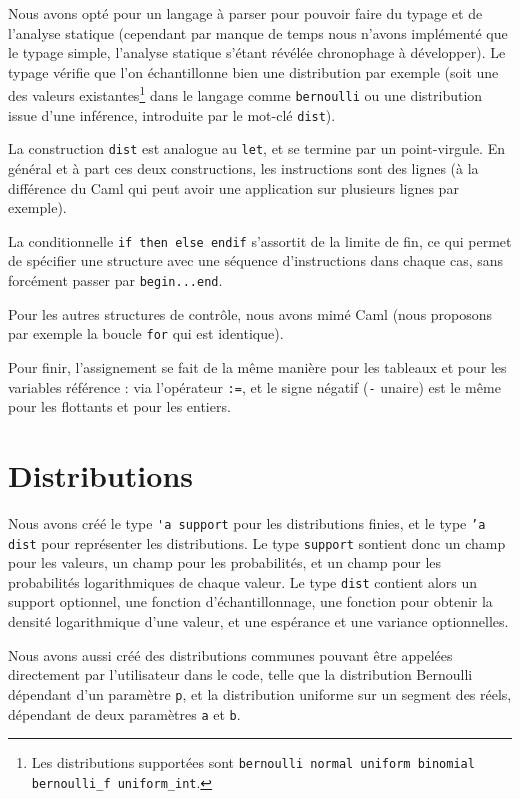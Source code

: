 \documentclass[svgnames]{article}
\begin{document}
Nous avons opté pour un langage à parser pour pouvoir faire du typage et de l'analyse statique (cependant par manque de temps nous n'avons implémenté que le typage simple, l'analyse statique s'étant révélée chronophage à développer).
Le typage vérifie que l'on échantillonne bien une distribution par exemple (soit une des valeurs existantes\footnote{Les distributions supportées sont \texttt{bernoulli normal uniform binomial bernoulli\_f uniform\_int}.} dans le langage comme \verb|bernoulli| ou une distribution issue d'une inférence, introduite par le mot-clé \lstinline{dist}).

La construction \lstinline{dist} est analogue au \lstinline{let}, et se termine par un point-virgule. En général et à part ces deux constructions, les instructions sont des lignes (à la différence du Caml qui peut avoir une application sur plusieurs lignes par exemple). 

La conditionnelle \lstinline{if then else endif} s'assortit de la limite de fin, ce qui permet de spécifier une structure avec une séquence d'instructions dans chaque cas, sans forcément passer par \lstinline{begin...end}.

Pour les autres structures de contrôle, nous avons mimé Caml (nous proposons par exemple la boucle \lstinline{for} qui est identique).

Pour finir, l'assignement se fait de la même manière pour les tableaux et pour les variables référence : via l'opérateur \verb|:=|, et le signe négatif (\verb|-| unaire) est le même pour les flottants et pour les entiers.



\section{Distributions}

Nous avons créé le type \verb|'a support| pour les distributions finies, et le type \texttt{'a dist} pour représenter les distributions. Le type \texttt{support} sontient donc un champ pour les valeurs, un champ pour les probabilités, et un champ pour les probabilités logarithmiques de chaque valeur. Le type \texttt{dist} contient alors un support optionnel, une fonction d'échantillonnage, une fonction pour obtenir la densité logarithmique d'une valeur, et une espérance et une variance optionnelles.

Nous avons aussi créé des distributions communes pouvant être appelées directement par l'utilisateur dans le code, telle que la distribution Bernoulli dépendant d'un paramètre \texttt p, et la distribution uniforme sur un segment des réels, dépendant de deux paramètres \texttt a et \texttt b.
\end{document}
